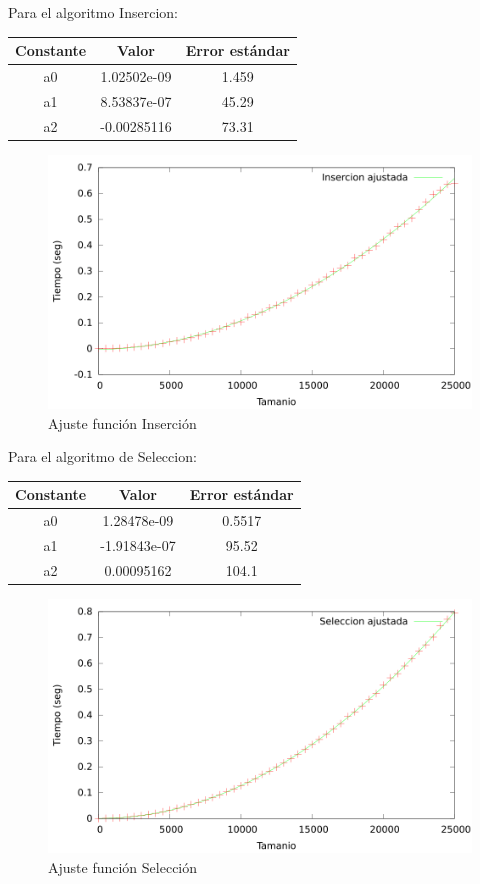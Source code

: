 \documentclass{article}
\begin{document}
Para el algoritmo Insercion:

	\begin{longtable}{|c|c|c|}
		\hline
		Constante		& Valor			& Error estándar	\\ \hline
		a0              & 1.02502e-09	& 1.459 \\ \hline
		a1              & 8.53837e-07	& 45.29 \\ \hline
		a2              & -0.00285116	& 73.31 \\ \hline
	\end{longtable}

	\begin{figure}[H]
		\centering
		\includegraphics[totalheight=8cm]{img/Insercion_ajustada}
		\caption{Ajuste función Inserción}
		\label{fig:Insercion_ajustada}
	\end{figure}

	Para el algoritmo de Seleccion:

	\begin{longtable}{|c|c|c|}
		\hline
		Constante		& Valor			& Error estándar	\\ \hline
		a0              & 1.28478e-09	& 0.5517 \\ \hline
		a1              & -1.91843e-07	& 95.52 \\ \hline
		a2              & 0.00095162	& 104.1 \\ \hline
	\end{longtable}

	\begin{figure}[H]
		\centering
		\includegraphics[totalheight=8cm]{img/Seleccion_ajustada}
		\caption{Ajuste función Selección}
		\label{fig:Seleccion_ajustada}
	\end{figure}
	
\end{document}
